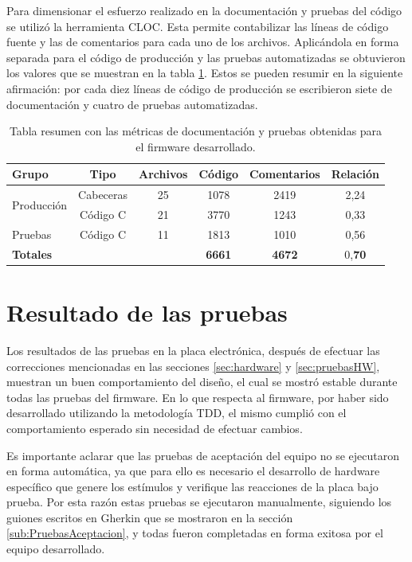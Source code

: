 Para dimensionar el esfuerzo realizado en la documentación y pruebas del código se utilizó la herramienta CLOC. Esta permite contabilizar las líneas de código fuente y las de comentarios para cada uno de los archivos. Aplicándola en forma separada para el código de producción y las pruebas automatizadas se obtuvieron los valores que se muestran en la tabla \ref{tab:MetricasFirmware}. Estos se pueden resumir en la siguiente afirmación: por cada diez líneas de código de producción se escribieron siete de documentación y cuatro de pruebas automatizadas.

\begin{table}[h]
	\centering
	\caption[Metricas de documentación y pruebas]{Tabla resumen con las métricas de documentación y pruebas obtenidas para el firmware desarrollado.}
	\begin{tabular}{l c c c c c }
		\toprule
		\textbf{Grupo} &
		\textbf{Tipo} &
		\textbf{Archivos} &
		\textbf{Código} &
		\textbf{Comentarios} &
		\textbf{Relación} \\
		\midrule
		\multirow[c]{2}{*}{Producción}
				& Cabeceras & 25 & 1078 & 2419 & 2,24 \\
				& Código C 	& 21 & 3770 & 1243 & 0,33 \\
		Pruebas & Código C 	& 11 & 1813 & 1010 & 0,56 \\
		\textbf{Totales} &		    & 	 & \textbf{6661} & \textbf{4672} & 0,\textbf{70}  \\
		\bottomrule
		\hline
	\end{tabular}
	\label{tab:MetricasFirmware}
\end{table}

\section{Resultado de las pruebas}
\label{sec:PruebasFirmware}

Los resultados de las pruebas en la placa electrónica, después de efectuar las correcciones mencionadas en las secciones \ref{sec:hardware} y \ref{sec:pruebasHW}, muestran un buen comportamiento del diseño, el cual se mostró estable durante todas las pruebas del firmware. En lo que respecta al firmware, por haber sido desarrollado utilizando la metodología TDD, el mismo cumplió con el comportamiento esperado sin necesidad de efectuar cambios. 

Es importante aclarar que las pruebas de aceptación del equipo no se ejecutaron en forma automática, ya que para ello es necesario el desarrollo de hardware específico que genere los estímulos y verifique las reacciones de la placa bajo prueba. Por esta razón estas pruebas se ejecutaron manualmente, siguiendo los guiones escritos en Gherkin que se mostraron en la sección \ref{sub:PruebasAceptacion}, y todas fueron completadas en forma exitosa por el equipo desarrollado. 





